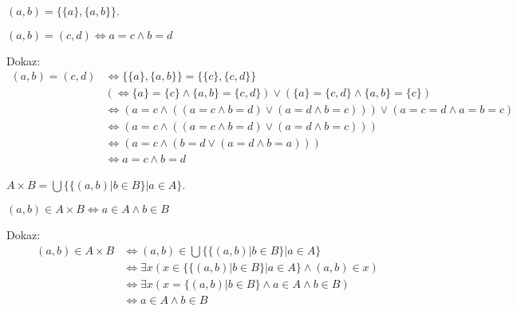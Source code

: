 \begin{definicija}
    $(a, b) = \{\{a\},\{a,b\}\}$.
\end{definicija}

\begin{trditev}
    $(a, b) = (c, d) \iff a = c \wedge b = d$
\end{trditev}
Dokaz:
\begin{align*}
    (a, b) = (c, d) &\iff \{\{a\},\{a,b\}\} = \{\{c\},\{c,d\}\} \\
    &(\iff \{a\} = \{c\} \wedge \{a,b\} = \{c,d\}) \vee (\{a\} = \{c,d\} \wedge \{a,b\} = \{c\}) \\
    &\iff (a = c \wedge ((a = c \wedge b = d) \vee (a = d \wedge b = c))) \vee (a = c = d \wedge a = b = c) \\
    &\iff (a = c \wedge ((a = c \wedge b = d) \vee (a = d \wedge b = c))) \\
    &\iff (a = c \wedge (b = d \vee (a = d \wedge b = a))) \\
    &\iff a = c \wedge b = d
\end{align*}

\begin{definicija}
    $A \times B = \bigcup\{\{(a,b) | b \in B\} | a \in A\}$.
\end{definicija}

\begin{trditev}
    $(a, b) \in A \times B \iff a \in A \wedge b \in B$
\end{trditev}

Dokaz:
\begin{align*}
    (a, b) \in A \times B &\iff (a, b) \in \bigcup\{\{(a,b) | b \in B\} | a \in A\} \\
    &\iff \exists x (x \in \{\{(a,b) | b \in B\} | a \in A\} \wedge (a, b) \in x) \\
    &\iff \exists x (x = \{(a,b) | b \in B\} \wedge a \in A \wedge b \in B) \\
    &\iff a \in A \wedge b \in B
\end{align*}
